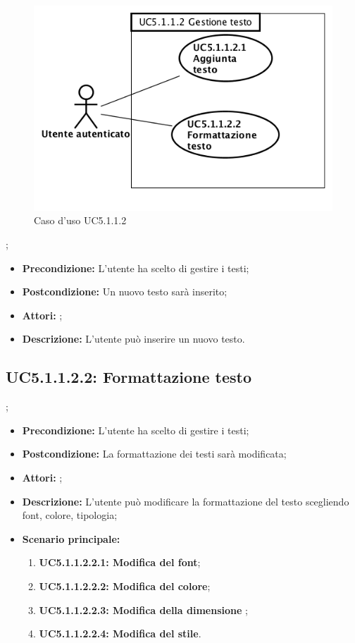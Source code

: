 \begin{figure}[h]
	\begin{center}
	\includegraphics[scale=0.4]{diagram/UC5-1-1-2.png}
	\caption{Caso d'uso UC5.1.1.2}
	\end{center}
\end{figure};
\begin{itemize}
	\item \textbf{Precondizione:} L'utente ha scelto di gestire i testi;
	\item \textbf{Postcondizione:} Un nuovo testo sarà inserito;
	\item \textbf{Attori:} ;
	\item \textbf{Descrizione:} L'utente può inserire un nuovo testo.
\end{itemize}
\subsection{ UC5.1.1.2.2: Formattazione testo}
;
\begin{itemize}
	\item \textbf{Precondizione:} L'utente ha scelto di gestire i testi;
	\item \textbf{Postcondizione:} La formattazione dei testi sarà modificata;
	\item \textbf{Attori:} ;
	\item \textbf{Descrizione:} L'utente può modificare la formattazione del testo scegliendo font, colore, tipologia;
	\item \textbf{Scenario principale:}
	\begin{enumerate}
		\item \textbf{ UC5.1.1.2.2.1: Modifica del font};
		\item \textbf{ UC5.1.1.2.2.2: Modifica del colore};
		\item \textbf{ UC5.1.1.2.2.3: Modifica della dimensione };
		\item \textbf{ UC5.1.1.2.2.4: Modifica del stile}.
	\end{enumerate}
\end{itemize}
